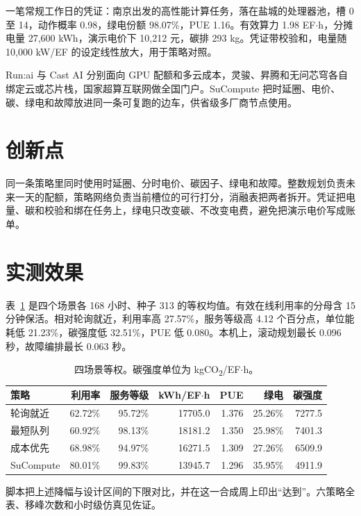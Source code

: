 一笔常规工作日的凭证：南京出发的高性能计算任务，落在盐城的处理器池，槽 0 至 14，动作概率 0.98，绿电份额 98.07\%，PUE 1.16。有效算力 1.98 EF$\cdot$h，分摊电量 27{,}600 kWh，演示电价下 10{,}212 元，碳排 293 kg。凭证带校验和，电量随 10{,}000 kW/EF 的设定线性放大，用于策略对照。

Run:ai 与 Cast AI 分别面向 GPU 配额和多云成本，灵骏、昇腾和无问芯穹各自绑定云或芯片栈，国家超算互联网做全国门户。SuCompute 把时延圈、电价、碳、绿电和故障放进同一条可复跑的边车，供省级多厂商节点使用。

\section{创新点}
同一条策略里同时使用时延圈、分时电价、碳因子、绿电和故障。整数规划负责未来一天的配额，策略网络负责当前槽位的可行打分，消融表把两者拆开。凭证把电量、碳和校验和绑在任务上，绿电只改变碳、不改变电费，避免把演示电价写成账单。

\section{实测效果}
表~\ref{tab:kpi} 是四个场景各 168 小时、种子 313 的等权均值。有效在线利用率的分母含 15 分钟保活。相对轮询就近，利用率高 27.57\%，服务等级高 4.12 个百分点，单位能耗低 21.23\%，碳强度低 32.51\%，PUE 低 0.080。本机上，滚动规划最长 0.096 秒，故障编排最长 0.063 秒。

\begin{table}[ht]
\centering
\caption{四场景等权。碳强度单位为 kgCO\textsubscript{2}/EF$\cdot$h。}
\label{tab:kpi}
\footnotesize
\setlength{\tabcolsep}{3.5pt}
\begin{tabular}{lrrrrrr}
\toprule
策略 & 利用率 & 服务等级 & kWh/EF$\cdot$h & PUE & 绿电 & 碳强度 \\
\midrule
轮询就近 & 62.72\% & 95.72\% & 17705.0 & 1.376 & 25.26\% & 7277.5 \\
最短队列 & 60.92\% & 98.13\% & 18181.2 & 1.350 & 25.98\% & 7401.3 \\
成本优先 & 68.98\% & 94.97\% & 16271.5 & 1.309 & 27.26\% & 6509.9 \\
SuCompute & 80.01\% & 99.83\% & 13945.7 & 1.296 & 35.95\% & 4911.9 \\
\bottomrule
\end{tabular}
\end{table}

脚本把上述降幅与设计区间的下限对比，并在这一合成周上印出“达到”。六策略全表、移峰次数和小时级仿真见佐证。

